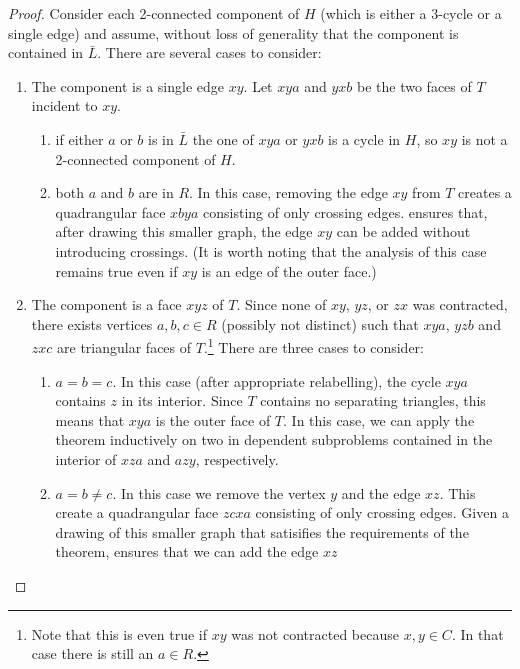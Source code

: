 \documentclass{patmorin}
\begin{document}
\begin{proof}
   Consider each 2-connected component of $H$ (which is either a 3-cycle
   or a single edge) and assume, without loss of generality that the
   component is contained in $\bar L$.  There are several cases to
   consider:
   \begin{enumerate}
	\item The component is a single edge $xy$.  Let $xya$ and $yxb$
	be the two faces of $T$ incident to $xy$.
        \begin{enumerate}
            \item if either $a$ or $b$ is in $\bar L$ the one of $xya$
            or $yxb$ is a cycle in $H$, so $xy$ is not a 2-connected
            component of $H$.  \item both $a$ and $b$ are in $R$.  In this
            case, removing the edge $xy$ from $T$ creates a quadrangular
            face $xbya$ consisting of only crossing edges. 
            ensures that, after drawing this smaller graph, the edge $xy$
            can be added without introducing crossings.  (It is worth
            noting that the analysis of this case remains true even if
            $xy$ is an edge of the outer face.)
        \end{enumerate}
        \item The component is a face $xyz$ of $T$.  Since none of $xy$,
        $yz$, or $zx$ was contracted, there exists vertices $a,b,c\in R$
        (possibly not distinct) such that $xya$, $yzb$ and $zxc$ are
        triangular faces of $T$.\footnote{Note that this is even true if
        $xy$ was not contracted because $x,y\in C$. In that case there
        is still an $a\in R$.}  There are three cases to consider:
        \begin{enumerate}
          \item $a=b=c$.  In this case (after appropriate relabelling),
            the cycle $xya$ contains $z$ in its interior.  Since $T$
            contains no separating triangles, this means that $xya$
            is the outer face of $T$. In this case, we can apply
            the theorem inductively on two in dependent subproblems
            contained in the interior of $xza$ and $azy$, respectively.
          \item $a=b\neq c$. In this case we remove the vertex $y$
            and the edge $xz$.  This create a quadrangular face $zcxa$
            consisting of only crossing edges.  Given a drawing of
            this smaller graph that satisifies the requirements of the
            theorem,  ensures that we can add the edge $xz$

\end{enumerate}
\end{enumerate}
\end{proof}
\end{document}
